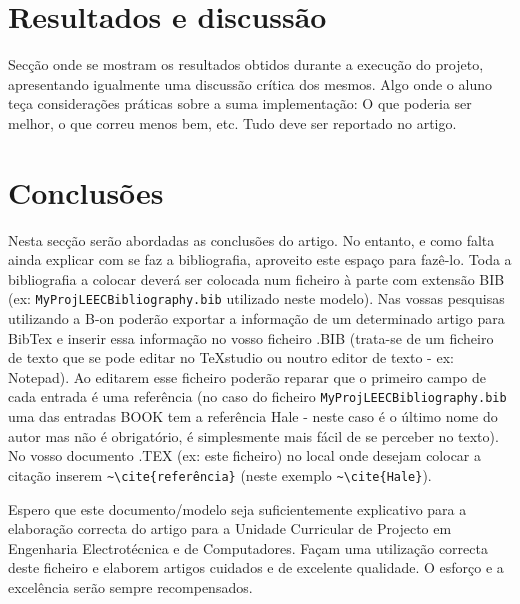 \documentclass[journal, twoside, a4paper]{IEEEtran_LEEC_v1}
\begin{document}
\section{Resultados e discussão}
Secção onde se mostram os resultados obtidos durante a execução do projeto, apresentando igualmente uma discussão crítica dos mesmos. Algo onde o aluno teça considerações práticas sobre a suma implementação: O que poderia ser melhor, o que correu menos bem, etc. Tudo deve ser reportado no artigo.

\section{Conclusões}

Nesta secção serão abordadas as conclusões do artigo. No entanto, e como falta ainda explicar com se faz a bibliografia, aproveito este espaço para fazê-lo. Toda a bibliografia a colocar deverá ser colocada num ficheiro à parte com extensão BIB (ex: \verb"MyProjLEECBibliography.bib" utilizado neste modelo). Nas vossas pesquisas utilizando a B-on poderão exportar a informação de um determinado artigo para BibTex e inserir essa informação no vosso ficheiro .BIB (trata-se de um ficheiro de texto que se pode editar no TeXstudio ou noutro editor de texto - ex: Notepad). Ao editarem esse ficheiro poderão reparar que o primeiro campo de cada entrada é uma referência (no caso do ficheiro \verb"MyProjLEECBibliography.bib" uma das entradas BOOK tem a referência Hale - neste caso é o último nome do autor mas não é obrigatório, é simplesmente mais fácil de se perceber no texto). No vosso documento .TEX (ex: este ficheiro) no local onde desejam colocar a citação inserem \verb"~\cite{referência}" (neste exemplo \verb"~\cite{Hale}").

Espero que este documento/modelo seja suficientemente explicativo para a elaboração correcta do artigo para a Unidade Curricular de Projecto em Engenharia Electrotécnica e de Computadores. Façam uma utilização correcta deste ficheiro e elaborem artigos cuidados e de excelente qualidade. O esforço e a excelência serão sempre recompensados.


\end{document}
